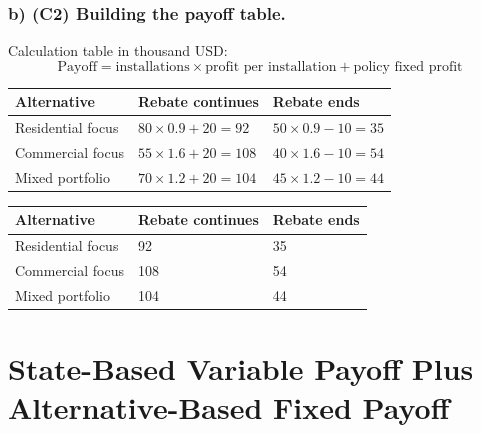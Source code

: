 	
	\subsubsection*{b) \textbf{(C2)} Building the payoff table.}
	\label{subsec:problem12-solar-installation-bids-c2}
	Calculation table in thousand USD:
	\[
	\text{Payoff}=\text{installations}\times\text{profit per installation}+\text{policy fixed profit}
	\]
	\begin{center}
		\begin{tabular}{lll}
			\toprule
			Alternative & Rebate continues & Rebate ends \\
			\midrule
			Residential focus & $80 \times 0.9 + 20 = 92$ & $50 \times 0.9 - 10 = 35$ \\
			Commercial focus & $55 \times 1.6 + 20 = 108$ & $40 \times 1.6 - 10 = 54$ \\
			Mixed portfolio & $70 \times 1.2 + 20 = 104$ & $45 \times 1.2 - 10 = 44$ \\
			\bottomrule
		\end{tabular}
	\end{center}
	
	\begin{center}
		\begin{tabular}{lll}
			\toprule
			Alternative & Rebate continues & Rebate ends \\
			\midrule
			Residential focus & 92 & 35 \\
			Commercial focus & 108 & 54 \\
			Mixed portfolio & 104 & 44 \\
			\bottomrule
		\end{tabular}
	\end{center}
	
	
	\section{State-Based Variable Payoff Plus Alternative-Based Fixed Payoff}
	\label{sec:state-based-variable-payoff-plus-alternative-based-fixed-payoff}
	
	

